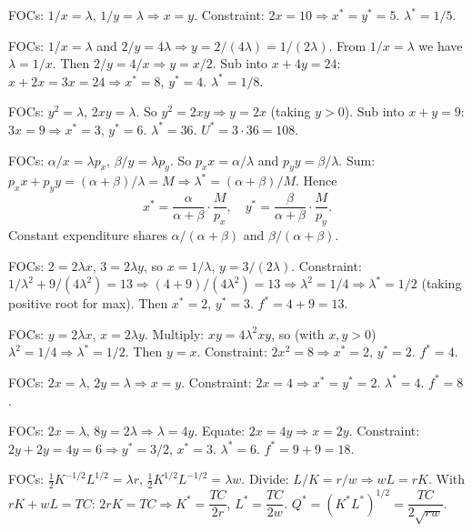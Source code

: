 \begin{solutions}
  \item FOCs: $1/x = \lambda$, $1/y = \lambda \Rightarrow x = y$. Constraint: $2 x = 10 \Rightarrow x^* = y^* = 5$. $\lambda^* = 1/5$.
  \item FOCs: $1/x = \lambda$ and $2/y = 4 \lambda \Rightarrow y = 2/(4 \lambda) = 1/(2 \lambda)$. From $1/x = \lambda$ we have $\lambda = 1/x$. Then $2/y = 4/x \Rightarrow y = x/2$. Sub into $x + 4 y = 24$: $x + 2 x = 3 x = 24 \Rightarrow x^* = 8$, $y^* = 4$. $\lambda^* = 1/8$.
  \item FOCs: $y^2 = \lambda$, $2 x y = \lambda$. So $y^2 = 2 x y \Rightarrow y = 2 x$ (taking $y > 0$). Sub into $x + y = 9$: $3 x = 9 \Rightarrow x^* = 3$, $y^* = 6$. $\lambda^* = 36$. $U^* = 3 \cdot 36 = 108$.
  \item FOCs: $\alpha/x = \lambda p_x$, $\beta/y = \lambda p_y$. So $p_x x = \alpha/\lambda$ and $p_y y = \beta/\lambda$. Sum: $p_x x + p_y y = (\alpha + \beta)/\lambda = M \Rightarrow \lambda^* = (\alpha + \beta)/M$. Hence
  \[ x^* = \frac{\alpha}{\alpha + \beta} \cdot \frac{M}{p_x}, \quad y^* = \frac{\beta}{\alpha + \beta} \cdot \frac{M}{p_y}. \]
  Constant expenditure shares $\alpha/(\alpha + \beta)$ and $\beta/(\alpha + \beta)$.
  \item FOCs: $2 = 2 \lambda x$, $3 = 2 \lambda y$, so $x = 1/\lambda$, $y = 3/(2 \lambda)$. Constraint: $1/\lambda^2 + 9/(4 \lambda^2) = 13 \Rightarrow (4 + 9)/(4 \lambda^2) = 13 \Rightarrow \lambda^2 = 1/4 \Rightarrow \lambda^* = 1/2$ (taking positive root for max). Then $x^* = 2$, $y^* = 3$. $f^* = 4 + 9 = 13$.
  \item FOCs: $y = 2 \lambda x$, $x = 2 \lambda y$. Multiply: $x y = 4 \lambda^2 x y$, so (with $x, y > 0$) $\lambda^2 = 1/4 \Rightarrow \lambda^* = 1/2$. Then $y = x$. Constraint: $2 x^2 = 8 \Rightarrow x^* = 2$, $y^* = 2$. $f^* = 4$.
  \item FOCs: $2 x = \lambda$, $2 y = \lambda \Rightarrow x = y$. Constraint: $2 x = 4 \Rightarrow x^* = y^* = 2$. $\lambda^* = 4$. $f^* = 8$.
  \item FOCs: $2 x = \lambda$, $8 y = 2 \lambda \Rightarrow \lambda = 4 y$. Equate: $2 x = 4 y \Rightarrow x = 2 y$. Constraint: $2 y + 2 y = 4 y = 6 \Rightarrow y^* = 3/2$, $x^* = 3$. $\lambda^* = 6$. $f^* = 9 + 9 = 18$.
  \item FOCs: $\tfrac{1}{2} K^{-1/2} L^{1/2} = \lambda r$, $\tfrac{1}{2} K^{1/2} L^{-1/2} = \lambda w$. Divide: $L/K = r/w \Rightarrow w L = r K$. With $r K + w L = TC$: $2 r K = TC \Rightarrow K^* = \dfrac{TC}{2 r}$, $L^* = \dfrac{TC}{2 w}$. $Q^* = (K^* L^*)^{1/2} = \dfrac{TC}{2 \sqrt{r w}}$.

\end{solutions}
